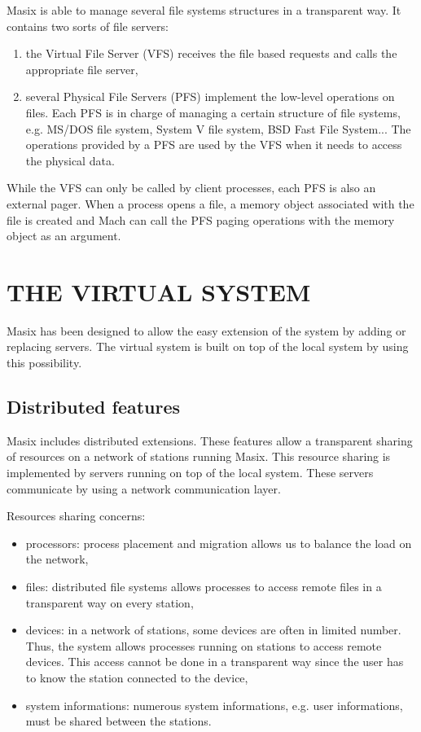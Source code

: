 	Masix is able to manage several file systems structures in a
transparent way. It contains two sorts of file servers:
\begin {enumerate}
\item the Virtual File Server (VFS) receives the file based requests and
calls the appropriate file server,
\item several Physical File Servers (PFS) implement the low-level operations
on files. Each PFS is in charge of managing a certain structure of file
systems, e.g. MS/DOS file system, System V file system, BSD Fast File System...
The operations provided by a PFS are used by the VFS when it needs to access
the physical data.
\end {enumerate}

	While the VFS can only be called by client processes, each PFS is also
an external pager. When a process opens a file, a memory object associated with
the file is created and Mach can call the PFS paging operations with the
memory object as an argument.

\section {THE VIRTUAL SYSTEM}

	Masix has been designed to allow the easy extension of the system
by adding or replacing servers. The virtual system is built on top of the
local system by using this possibility.

\subsection {Distributed features}

	Masix includes distributed extensions. These features allow a
transparent sharing of resources on a network of stations running Masix. This
resource sharing is implemented by servers running on top of the local
system. These servers communicate by using a network communication layer.

	Resources sharing concerns:
\begin {itemize}
\item processors: process placement and migration allows us to balance the
load on the network,
\item files: distributed file systems allows processes to access remote
files in a transparent way on every station,
\item devices: in a network of stations, some devices are often in
limited number. Thus, the system allows processes running on stations to
access remote devices. This access cannot be done in a transparent way since
the user has to know the station connected to the device,
\item system informations: numerous system informations, e.g. user
informations, must be shared between the stations.
\end {itemize}

